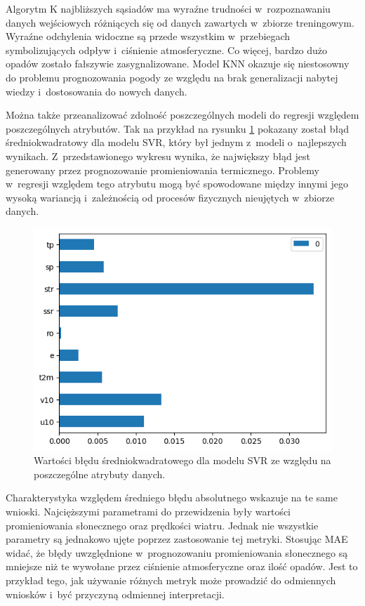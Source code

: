 Algorytm K najbliższych sąsiadów ma wyraźne trudności w~rozpoznawaniu danych wejściowych różniących się od 
danych zawartych w~zbiorze treningowym. Wyraźne odchylenia widoczne są przede wszystkim w~przebiegach  
symbolizujących odpływ i~ciśnienie atmosferyczne. Co więcej, bardzo dużo opadów zostało fałszywie
zasygnalizowane. Model KNN okazuje się niestosowny do problemu prognozowania pogody ze względu
na brak generalizacji nabytej wiedzy i~dostosowania do nowych danych.

\pagebreak

Można także przeanalizować zdolność poszczególnych modeli do regresji względem poszczególnych atrybutów.
Tak na przykład na rysunku \ref{svr-mse-bar} pokazany został błąd średniokwadratowy dla modelu SVR, który był
jednym z~modeli o~najlepszych wynikach. Z~przedstawionego wykresu wynika, że największy błąd jest generowany
przez prognozowanie promieniowania termicznego. Problemy w~regresji względem tego atrybutu mogą być  
spowodowane między innymi jego wysoką wariancją i~zależnością od procesów fizycznych nieujętych w~zbiorze 
danych.

\begin{figure}[H]
    \centering
    \includegraphics[width=\textwidth]{images/svr_mse_bar.png}
    \caption{Wartości błędu średniokwadratowego dla modelu SVR ze względu na poszczególne atrybuty danych.}
    \label{svr-mse-bar}
\end{figure}

Charakterystyka względem średniego błędu absolutnego wskazuje na te same wnioski. Najcięższymi parametrami
do przewidzenia były wartości promieniowania słonecznego oraz prędkości wiatru. Jednak nie wszystkie
parametry są jednakowo ujęte poprzez zastosowanie tej metryki. Stosując MAE widać, że błędy 
uwzględnione w~prognozowaniu promieniowania słonecznego są mniejsze niż te wywołane przez ciśnienie
atmosferyczne oraz ilość opadów. Jest to przykład tego, jak używanie różnych metryk może prowadzić do 
odmiennych wniosków i~być przyczyną odmiennej interpretacji.

